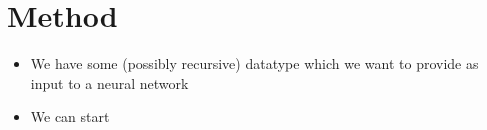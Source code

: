 \section{Method}

\begin{itemize}

    \item We have some (possibly recursive) datatype which we want to provide as input to a neural network

    \item We can start 

\end{itemize}